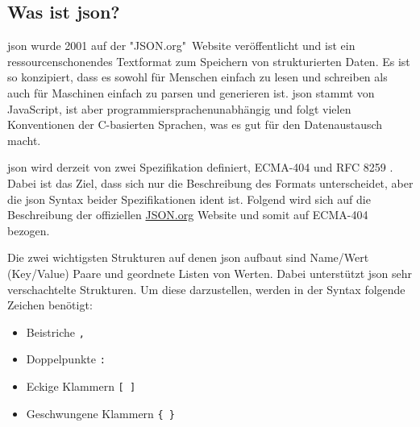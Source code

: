 \subsection{Was ist \acs{json}?}
\acf{json} wurde 2001 auf der "JSON.org"\ Website veröffentlicht und ist ein ressourcenschonendes Textformat zum Speichern von strukturierten Daten. Es ist so konzipiert, dass es sowohl für Menschen einfach zu lesen und schreiben als auch für Maschinen einfach zu parsen und generieren ist. \acs{json} stammt von JavaScript, ist aber programmiersprachenunabhängig und folgt vielen Konventionen der C-basierten Sprachen, was es gut für den Datenaustausch macht. \cite{json_org:o.J.} \cite{ECMA:2017} 

\acs{json} wird derzeit von zwei Spezifikation definiert, ECMA-404 \cite{ECMA:2017} und RFC 8259 \cite{Bray:2017}. Dabei ist das Ziel, dass sich nur die Beschreibung des Formats unterscheidet, aber die \acs{json} Syntax beider Spezifikationen ident ist. Folgend wird sich auf die Beschreibung der offiziellen \url{JSON.org} Website \cite{json_org:o.J.} und somit auf ECMA-404 \cite{ECMA:2017} bezogen.

Die zwei wichtigsten Strukturen auf denen \acs{json} aufbaut sind Name/Wert (\engl Key/Value) Paare und geordnete Listen von Werten. Dabei unterstützt \acs{json} sehr verschachtelte Strukturen. Um diese darzustellen, werden in der Syntax folgende Zeichen benötigt:
\begin{itemize}
	 \item Beistriche \lstinline|,|
	 \item Doppelpunkte \lstinline|:|
	 \item Eckige Klammern \lstinline|[ ]|
	 \item Geschwungene Klammern \lstinline|{ }|
\end{itemize}


